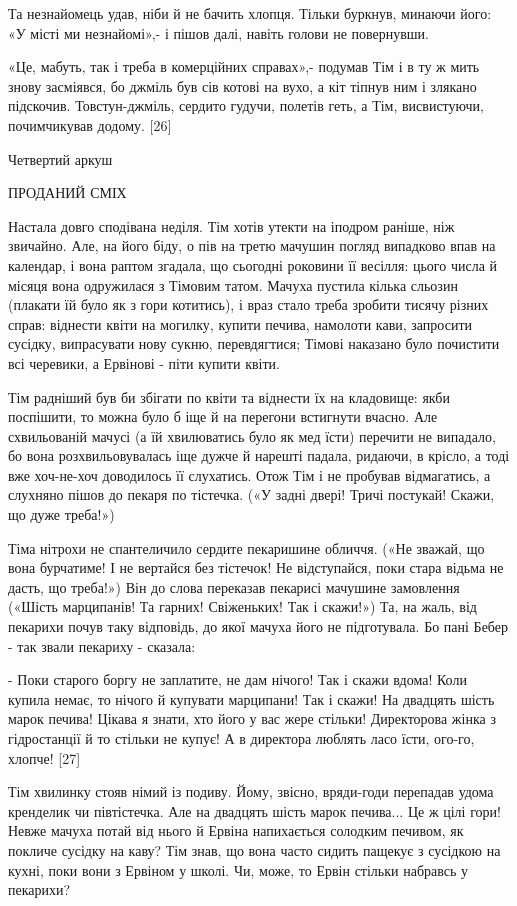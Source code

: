 Та незнайомець удав, ніби й не бачить хлопця. Тільки буркнув, минаючи його: «У місті ми незнайомі»,- і пішов далі, навіть голови не повернувши.

«Це, мабуть, так і треба в комерційних справах»,- подумав Тім і в ту ж мить знову засміявся, бо джміль був сів котові на вухо, а кіт тіпнув ним і злякано підскочив. Товстун-джміль, сердито гудучи, полетів геть, а Тім, висвистуючи, почимчикував додому. [26]

Четвертий аркуш

ПРОДАНИЙ СМІХ

Настала довго сподівана неділя. Тім хотів утекти на іподром раніше, ніж звичайно. Але, на його біду, о пів на третю мачушин погляд випадково впав на календар, і вона раптом згадала, що сьогодні роковини її весілля: цього числа й місяця вона одружилася з Тімовим татом. Мачуха пустила кілька сльозин (плакати їй було як з гори котитись), і враз стало треба зробити тисячу різних справ: віднести квіти на могилку, купити печива, намолоти кави, запросити сусідку, випрасувати нову сукню, перевдягтися; Тімові наказано було почистити всі черевики, а Ервінові - піти купити квіти.

Тім радніший був би збігати по квіти та віднести їх на кладовище: якби поспішити, то можна було б іще й на перегони встигнути вчасно. Але схвильованій мачусі (а їй хвилюватись було як мед їсти) перечити не випадало, бо вона розхвильовувалась іще дужче й нарешті падала, ридаючи, в крісло, а тоді вже хоч-не-хоч доводилось її слухатись. Отож Тім і не пробував відмагатись, а слухняно пішов до пекаря по тістечка. («У задні двері! Тричі постукай! Скажи, що дуже треба!»)

Тіма нітрохи не спантеличило сердите пекаришине обличчя. («Не зважай, що вона бурчатиме! І не вертайся без тістечок! Не відступайся, поки стара відьма не дасть, що треба!») Він до слова переказав пекарисі мачушине замовлення («Шість марципанів! Та гарних! Свіженьких! Так і скажи!») Та, на жаль, від пекарихи почув таку відповідь, до якої мачуха його не підготувала. Бо пані Бебер - так звали пекариху - сказала:

- Поки старого боргу не заплатите, не дам нічого! Так і скажи вдома! Коли купила немає, то нічого й купувати марципани! Так і скажи! На двадцять шість марок печива! Цікава я знати, хто його у вас жере стільки! Директорова жінка з гідростанції й то стільки не купує! А в директора люблять ласо їсти, ого-го, хлопче! [27]

Тім хвилинку стояв німий із подиву. Йому, звісно, вряди-годи перепадав удома кренделик чи півтістечка. Але на двадцять шість марок печива... Це ж цілі гори! Невже мачуха потай від нього й Ервіна напихається солодким печивом, як покличе сусідку на каву? Тім знав, що вона часто сидить пащекує з сусідкою на кухні, поки вони з Ервіном у школі. Чи, може, то Ервін стільки набравсь у пекарихи?

